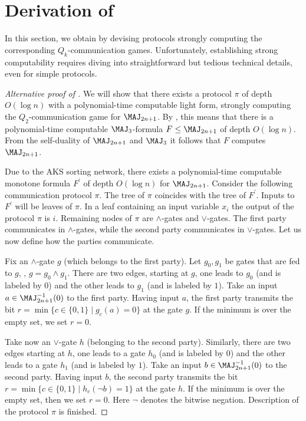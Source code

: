 \section{Derivation of  } \label{sec:corol}

In this section, we obtain   by devising protocols  strongly computing the corresponding $Q_k$-communication games. Unfortunately, establishing strong computability requires diving into straightforward but tedious technical details, even for simple protocols.  

\begin{proof}[Alternative proof of ]
 We will show that there exists 
%
a protocol $\pi$ of depth $O(\log n)$  %
with a polynomial-time computable light form, strongly computing the $Q_2$-communication game for $\MAJ_{2n + 1}$. By , this means that there is a polynomial-time computable 
%
$\MAJ_3$-formula $F \le \MAJ_{2n + 1}$ 
of depth $O(\log n)$.
{}From the self-duality of $\MAJ_{2n + 1}$ and $\MAJ_3$ it follows that $F$ computes $\MAJ_{2n + 1}$. 

Due to the AKS sorting network, there exists a polynomial-time computable 
%
monotone formula $F^\prime$
of depth $O(\log n)$  %
for $\MAJ_{2n  + 1}$. Consider the following communication protocol $\pi$.
The tree of $\pi$ coincides with the tree of $F^\prime$. Inputs to $F^\prime$ will be leaves of $\pi$. In a leaf containing an input variable $x_i$ the output of the protocol $\pi$ is $i$. Remaining nodes of $\pi$ are $\land$-gates and $\lor$-gates. The first party communicates in $\land$-gates, while the second party communicates in $\lor$-gates. Let us now define how the parties communicate.

Fix an  $\land$-gate $g$ (which belongs to the first party). Let $g_0, g_1$ be gates that are fed to $g$, \ie, $g = g_0 \land g_1$. There are two edges, starting at $g$, one leads to $g_0$ (and is labeled by $0$) and the other leads to $g_1$ (and is labeled by $1$). Take an input $a\in \MAJ_{2n + 1}^{-1}(0)$ to the first party. Having  input $a$, the first party transmits the bit $r  = \min\{ c \in \{0, 1\} \mid g_c(a) = 0\}$  at the gate $g$. If the minimum is over the empty set, we set $r = 0$. 

Take now an $\lor$-gate $h$ (belonging to the second party). Similarly, there are two edges starting at $h$, one leads to a gate $h_0$ (and is labeled by $0$) and the other leads to a gate $h_1$ (and is labeled by $1$). Take an input $b\in \MAJ_{2n + 1}^{-1}(0)$ to the second party. Having input $b$, the second party transmits the bit $r  = \min\{ c \in \{0, 1\} \mid h_c(\lnot b) = 1\}$ at the gate $h$.  If the minimum is over the empty set, then we set $r = 0$. Here $\lnot$ denotes the %
bitwise  %
negation. Description of the protocol $\pi$ is finished.


\end{proof}
